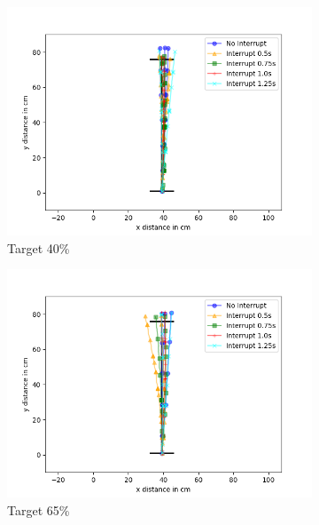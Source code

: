 \begin{figure}
	\centering
	\begin{subfigure}[b]{0.62\textwidth}
		\includegraphics[width=\textwidth]{pics/straight_40.png}
		\caption{Target 40\%}
		\label{fig:stra_exp1}
	\end{subfigure}
	\begin{subfigure}[b]{0.62\textwidth}
		\includegraphics[width=\textwidth]{pics/straight_65.png}
		\caption{Target 65\%}
		\label{fig:stra_exp2}
	\end{subfigure}
	\begin{subfigure}[b]{0.62\textwidth}

\end{subfigure}
\end{figure}
